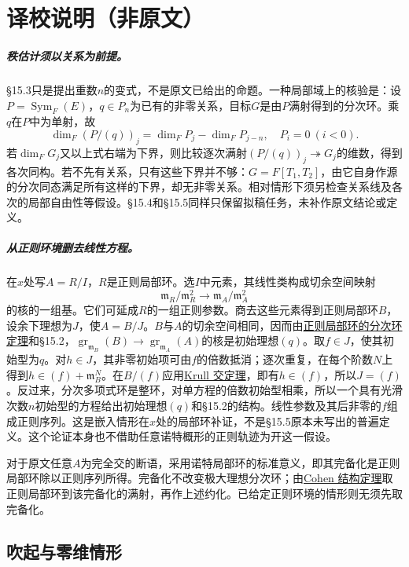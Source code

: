 \documentclass[openany,fontset=fandol]{ctexbook}
\newcommand{\m}{\mathfrak m}
\DeclareMathOperator{\gr}{gr}
\DeclareMathOperator{\Sym}{Sym}
\begin{document}
\chapter*{译校说明（非原文）}
\paragraph{秩估计须以关系为前提。}
§15.3只是提出重数$n$的变式，不是原文已给出的命题。一种局部域上的核验是：设$P=\Sym_F(E)$，$q\in P_n$为已有的非零关系，目标$G$是由$P$满射得到的分次环。乘$q$在$P$中为单射，故
\[
\dim_F(P/(q))_j=\dim_F P_j-\dim_F P_{j-n},\quad P_i=0\ (i<0).
\]
若$\dim_F G_j$又以上式右端为下界，则比较逐次满射$(P/(q))_j\twoheadrightarrow G_j$的维数，得到各次同构。若不先有关系，只有这些下界并不够：$G=F[T_1,T_2]$，由它自身作源的分次同态满足所有这样的下界，却无非零关系。相对情形下须另检查关系线及各次的局部自由性等假设。§15.4和§15.5同样只保留拟稿任务，未补作原文结论或定义。

\paragraph{从正则环境删去线性方程。}
在$x$处写$A=R/I$，$R$是正则局部环。选$I$中元素，其线性类构成切余空间映射
\[
\m_R/\m_R^2\longrightarrow\m_A/\m_A^2
\]
的核的一组基。它们可延成$R$的一组正则参数。商去这些元素得到正则局部环$B$，设余下理想为$J$，使$A=B/J$。$B$与$A$的切余空间相同，因而由\href{https://stacks.math.columbia.edu/tag/00NO}{正则局部环的分次环定理}和§15.2，$\gr_{\m_B}(B)\to\gr_{\m_A}(A)$的核是初始理想$(q)$。取$f\in J$，使其初始型为$q$。对$h\in J$，其非零初始项可由$f$的倍数抵消；逐次重复，在每个阶数$N$上得到$h\in(f)+\m_B^N$。在$B/(f)$应用\href{https://stacks.math.columbia.edu/tag/00IP}{Krull 交定理}，即有$h\in(f)$，所以$J=(f)$。反过来，分次多项式环是整环，对单方程的倍数初始型相乘，所以一个具有光滑次数$n$初始型的方程给出初始理想$(q)$和§15.2的结构。线性参数及其后非零的$f$组成正则序列。这是嵌入情形在$x$处的局部环补证，不是§15.5原本未写出的普遍定义。这个论证本身也不借助任意诺特概形的正则轨迹为开这一假设。

\clearpage
对于原文任意$A$为完全交的断语，采用诺特局部环的标准意义，即其完备化是正则局部环除以正则序列所得。完备化不改变极大理想分次环；由\href{https://stacks.math.columbia.edu/tag/032A}{Cohen 结构定理}取正则局部环到该完备化的满射，再作上述约化。已给定正则环境的情形则无须先取完备化。
\section*{吹起与零维情形}
\end{document}
